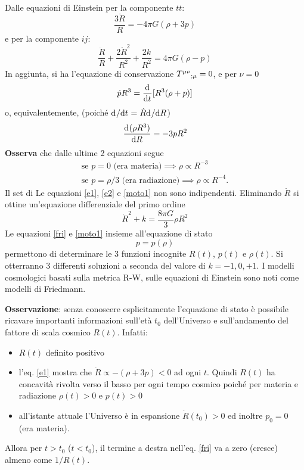 Dalle equazioni di Einstein per la componente $tt$:
\begin{equation}
  \frac{3 \ddot{R}}{R} = - 4\pi G (\rho+3p)
  \label{e1}
\end{equation}
e per la componente $ij$:
\begin{equation}
  \label{e2}
  \frac{\ddot{R}}{R} +\frac{2\dot{R}^2}{R^2}+\frac{2k}{R^2}= 4 \pi G (\rho-p)
\end{equation}
In aggiunta, si ha l'equazione di conservazione
$\tensor{T}{^{\mu \nu}}{_{;\mu}} = 0$, e per $\nu =0$
\begin{equation}
  \dot{p} R^3 = \frac{{\mathop{}\!\mathrm{d}^{}}}{\mathop{}\!\mathrm{d} {t}^{}}[R^3(\rho+p)]
  \label{moto1}
\end{equation}
o, equivalentemente, (poiché $\mathrm{d}^{} / \mathrm{d} {t}^{} = \dot{R} \mathrm{d}^{} / \mathrm{d} {R}^{}$)
\begin{equation}
  \frac{{\mathop{}\!\mathrm{d}^{}}(\rho R^3)}{\mathop{}\!\mathrm{d} {R}^{}} = -3pR^2
  \label{moto2}
\end{equation}
{\bf Osserva} che dalle ultime 2 equazioni segue
\begin{subequations}
  \begin{gather}
    \text{se $p=0$ (era materia)} \implies \rho \propto R^{-3} \\
    \text{se $p=\rho/3$ (era radiazione)} \implies \rho \propto R^{-4} .
  \end{gather}
\end{subequations}
Il set di Le equazioni \eqref{e1}, \eqref{e2} e \eqref{moto1} non sono
indipendenti.  Eliminando $\ddot{R}$ si ottine un'equazione differenziale del
primo ordine
\begin{equation}
  \dot{R}^2 +k = \frac{8 \pi G}{3} \rho R^2
  \label{fri}
\end{equation}
Le equazioni \eqref{fri} e \eqref{moto1} insieme all'equazione di stato
\begin{equation}
  p=p(\rho)
  \label{stato}
\end{equation}
permettono di determinare le 3 funzioni incognite $R(t)$, $p(t)$ e $\rho(t)$.
Si otterranno 3 differenti soluzioni a seconda del valore di $k=-1,0,+1$.  I
modelli cosmologici basati sulla metrica R-W, sulle equazioni di Einstein sono
noti come modelli di Friedmann.

{\bf Osservazione}: senza conoscere esplicitamente l'equazione di stato è
possibile ricavare importanti informazioni sull'età $t_0$ dell'Universo e
sull'andamento del fattore di scala cosmico $R(t)$.  Infatti:
\begin{itemize}
\item $R(t)$ definito positivo
\item l'eq. \eqref{e1} mostra che $ \ddot{R} \propto - (\rho+3p) <0$ ad ogni
  $t$.  Quindi $R(t)$ ha concavità rivolta verso il basso per ogni tempo cosmico
  poiché per materia e radiazione $\rho(t)>0$ e $p(t)>0$
\item all'istante attuale l'Universo è in espansione $\dot{R}(t_0) >0$ ed
  inoltre $p_0=0$ (era materia).
\end{itemize}
Allora per $t>t_0$ ($t<t_0$), il termine a destra nell'eq. \ref{fri} va a zero
(cresce) almeno come $1/R(t)$.

